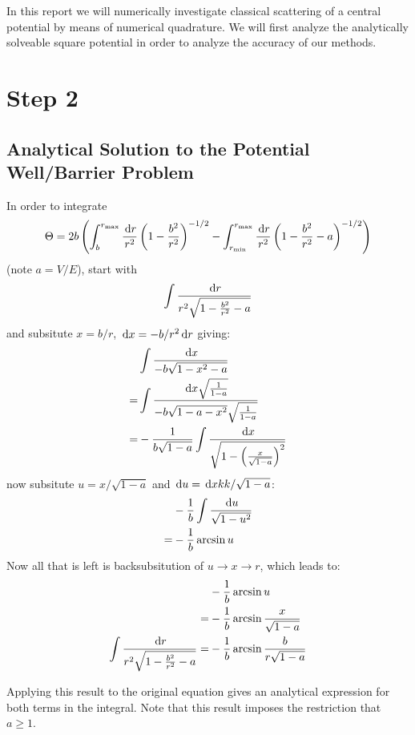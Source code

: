 


In this report we will numerically investigate classical scattering of a central potential by means of numerical quadrature.
 We will first analyze the analytically solveable square potential in order to analyze the accuracy of our methods.

\section{Step 2}
\subsection{Analytical Solution to the Potential Well/Barrier Problem}
In order to integrate
\begin{align}
  \Theta = 2b\left( \int_b^{r_{\text{max}}} \frac{\,\text{d}r}{r^2}\left(1-\frac{b^2}{r^2}\right)^{-1/2} - \int_{r_\text{min}}^{r_{\text{max}}} \frac{\,\text{d}r}{r^2}\left(1-\frac{b^2}{r^2}-a\right)^{-1/2}\right)
\end{align}
(note $a = V/E$),
start with
\begin{align}
  \int \frac{\,\text{d}r}{r^2\sqrt{1-\frac{b^2}{r^2}-a}}
\end{align}
and subsitute $x = b/r$, $\,\text{d}x = -b/r^2 \,\text{d}r$ giving:
\begin{align}
  &\int \frac{\,\text{d}x}{-b\sqrt{1-x^2-a}}\\\nonumber
  =&\int \frac{\,\text{d}x \sqrt{\frac{1}{1-a}}}{-b \sqrt{1-a-x^2}\sqrt{\frac{1}{1-a}}}\\\nonumber
  =&-\frac{1}{b\sqrt{1-a}}\int\frac{\,\text{d}x}{\sqrt{1-\left(\frac{x}{\sqrt{1-a}}\right)^2}}
\end{align}
now subsitute $u = x/\sqrt{1-a}$ and $\,\text{d}u = \,\text{d}xkk/\sqrt{1-a}$:
\begin{align}
  &-\frac{1}{b}\int\frac{\,\text{d}u}{\sqrt{1-u^2}}\\\nonumber
  = &-\frac{1}{b} \arcsin u
\end{align}
Now all that is left is backsubsitution of $u\to x \to r$, which leads to:
\begin{align}
  &-\frac{1}{b} \arcsin u\\\nonumber
  =&-\frac{1}{b} \arcsin \frac{x}{\sqrt{1-a}}\\\nonumber
  \int \frac{\,\text{d}r}{r^2\sqrt{1-\frac{b^2}{r^2}-a}}=&-\frac{1}{b} \arcsin \frac{b}{r\sqrt{1-a}}
\end{align}

\par Applying this result to the original equation gives an analytical expression for both terms in the integral. Note that this result imposes the restriction that $a \geq 1$.

